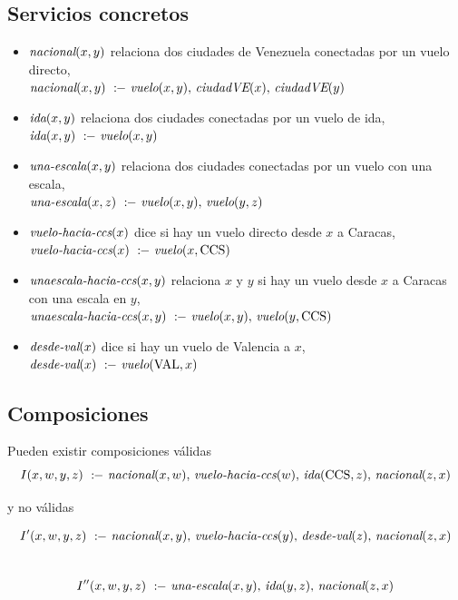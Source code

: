 \documentclass{beamer}
\newcommand{\qrule}{:\!\!-}
\newcommand{\vuelo}{\text{\it vuelo}}
\newcommand{\ciudadVE}{\text{\it ciudadVE}}
\newcommand{\nacional}{\text{\it nacional}}
\newcommand{\ida}{\text{\it ida}}
\newcommand{\unaescala}{\text{\it una-escala}}
\newcommand{\vueloCCS}{\text{\it vuelo-hacia-ccs}}
\newcommand{\unaparadaCCS}{\text{\it unaescala-hacia-ccs}}
\newcommand{\desdeVAL}{\text{\it desde-val}}
\newcommand{\PA}{\text{CCS}}
\newcommand{\NY}{\text{VAL}}
\begin{document}
\subsection{Servicios concretos}

\frame
{
\begin{itemize}
\item {\tiny $\nacional(x,y)$ relaciona dos ciudades de Venezuela conectadas por un vuelo directo,} \\
      {\tiny $\nacional(x,y)\   \qrule\ \vuelo(x,y),\,\ciudadVE(x),\,\ciudadVE(y)$}\\
\item {\tiny $\ida(x,y)$ relaciona dos ciudades conectadas por un vuelo de ida,}\\
      {\tiny $\ida(x,y)\     \qrule\ \vuelo(x,y)$}\\
\item {\tiny $\unaescala(x,y)$ relaciona dos ciudades conectadas por un vuelo con una escala,}\\
      {\tiny $\unaescala(x,z)\    \qrule\ \vuelo(x,y),\,\vuelo(y,z)$}\\
\item {\tiny $\vueloCCS(x)$ dice si hay un vuelo directo desde $x$ a Caracas,}\\
      {\tiny $\vueloCCS(x)\     \qrule\ \vuelo(x,\PA)$}\\
\item {\tiny $\unaparadaCCS(x,y)$ relaciona $x$ y $y$ si hay un vuelo desde $x$ a Caracas con una escala en $y$,}\\
      {\tiny $\unaparadaCCS(x,y)\  \qrule\ \vuelo(x,y),\,\vuelo(y,\PA)$}\\
\item {\tiny $\desdeVAL(x)$ dice si hay un vuelo de Valencia a $x$,}\\
      {\tiny $\desdeVAL(x)\       \qrule\ \vuelo(\NY,x)$}\\
\end{itemize}
}

\subsection{Composiciones}

\frame
{
    Pueden existir composiciones válidas
{\tiny $$I(x,w,y,z)\ \qrule\ \nacional(x,w),\,\vueloCCS(w),\,\ida(\PA,z),\,\nacional(z,x)$$}

    y no válidas

{\tiny $$I'(x,w,y,z)\  \qrule\ \nacional(x,y),\,\vueloCCS(y),\,\desdeVAL(z),\,\nacional(z,x)$$\\
       $$I''(x,w,y,z)\ \qrule\ \unaescala(x,y),\,\ida(y,z),\,\nacional(z,x)$$\\
}
}
\end{document}
